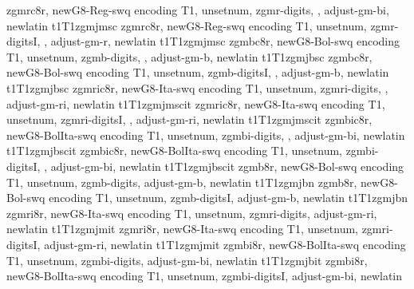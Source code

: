 %
{zgmrc8r,%
newG8-Reg-swq encoding T1,%
unsetnum,%
zgmr-digits,%
\metrics {}  ,%
adjust-gm-bi,%
newlatin}
{t1}{T1}{zgmj}{m}{sc}{}
%
{zgmrc8r,%
newG8-Reg-swq encoding T1,%
unsetnum,%
zgmr-digitsI,%
\metrics {}  ,%
adjust-gm-r,%
newlatin}
{t1}{T1}{zgmj}{m}{sc}{}
%
{zgmbc8r,%
newG8-Bol-swq encoding T1,%
unsetnum,%
zgmb-digits,%
\metrics {}  ,%
adjust-gm-b,%
newlatin}
{t1}{T1}{zgmj}{b}{sc}{}
%
{zgmbc8r,%
newG8-Bol-swq encoding T1,%
unsetnum,%
zgmb-digitsI,%
\metrics {}  ,%
adjust-gm-b,%
newlatin}
{t1}{T1}{zgmj}{b}{sc}{}
%
{zgmric8r,%
newG8-Ita-swq encoding T1,%
unsetnum,%
zgmri-digits,%
\metrics {}  ,%
adjust-gm-ri,%
newlatin}
{t1}{T1}{zgmj}{m}{scit}{}
%
{zgmric8r,%
newG8-Ita-swq encoding T1,%
unsetnum,%
zgmri-digitsI,%
\metrics {}  ,%
adjust-gm-ri,%
newlatin}
{t1}{T1}{zgmj}{m}{scit}{}
%
{zgmbic8r,%
newG8-BolIta-swq encoding T1,%
unsetnum,%
zgmbi-digits,%
\metrics {}  ,%
adjust-gm-bi,%
newlatin}
{t1}{T1}{zgmj}{b}{scit}{}
%
{zgmbic8r,%
newG8-BolIta-swq encoding T1,%
unsetnum,%
zgmbi-digitsI,%
\metrics {}  ,%
adjust-gm-bi,%
newlatin}
{t1}{T1}{zgmj}{b}{scit}{}
%
{zgmb8r,%
newG8-Bol-swq encoding T1,%
unsetnum,%
zgmb-digits,%
adjust-gm-b,%
newlatin}
{t1}{T1}{zgmj}{b}{n}{}
%
{zgmb8r,%
newG8-Bol-swq encoding T1,%
unsetnum,%
zgmb-digitsI,%
adjust-gm-b,%
newlatin}
{t1}{T1}{zgmj}{b}{n}{}
%
{zgmri8r,%
newG8-Ita-swq encoding T1,%
unsetnum,%
zgmri-digits,%
adjust-gm-ri,%
newlatin}
{t1}{T1}{zgmj}{m}{it}{}
%
{zgmri8r,%
newG8-Ita-swq encoding T1,%
unsetnum,%
zgmri-digitsI,%
adjust-gm-ri,%
newlatin}
{t1}{T1}{zgmj}{m}{it}{}
%
{zgmbi8r,%
newG8-BolIta-swq encoding T1,%
unsetnum,%
zgmbi-digits,%
adjust-gm-bi,%
newlatin}
{t1}{T1}{zgmj}{b}{it}{}
%
{zgmbi8r,%
newG8-BolIta-swq encoding T1,%
unsetnum,%
zgmbi-digitsI,%
adjust-gm-bi,%
newlatin}
